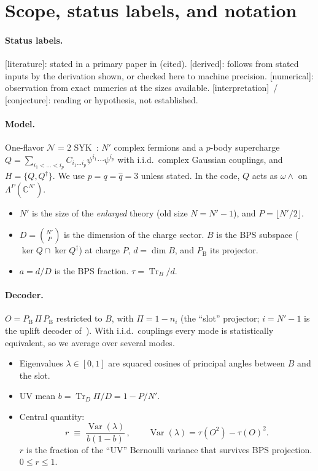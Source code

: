 \documentclass[11pt]{article}
\newcommand{\Tr}{\operatorname{Tr}}
\newcommand{\PB}{P_{\mathrm B}}
\newcommand{\Var}{\operatorname{Var}}
\newcommand{\Np}{N'}
\newcommand{\tagbox}[2]{\textsf{\small\color{#1}[#2]}}
\newcommand{\EST}{\tagbox{cest}{literature}}
\newcommand{\DER}{\tagbox{cder}{derived}}
\newcommand{\NUM}{\tagbox{cnum}{numerical}}
\newcommand{\CONJ}{\tagbox{cconj}{conjecture}}
\newcommand{\INTERP}{\tagbox{cconj}{interpretation}}
\theoremstyle{remark}
\begin{document}
\tableofcontents

\section{Scope, status labels, and notation}

\paragraph{Status labels.}
\EST: stated in a primary paper in  (cited).
\DER: follows from stated inputs by the derivation shown, or checked here to machine precision.
\NUM: observation from exact numerics at the sizes available.
\INTERP\ / \CONJ: reading or hypothesis, not established.

\paragraph{Model.} One-flavor $\mathcal N{=}2$ SYK~\cite{FGMS,CV}: $\Np$ complex fermions and a $p$-body supercharge
$Q=\sum_{i_1<\dots<i_p}C_{i_1\dots i_p}\psi^{i_1}\cdots\psi^{i_p}$ with i.i.d.\ complex Gaussian couplings, and
$H=\{Q,Q^\dagger\}$. We use $p=q=\hat q=3$ unless stated. In the code, $Q$ acts as $\omega\wedge$ on
$\Lambda^P(\mathbb C^{\Np})$.
\begin{itemize}\itemsep1pt
\item $\Np$ is the size of the \emph{enlarged} theory (old size $N=\Np-1$), and $P=\lfloor \Np/2\rfloor$.
\item $D=\binom{\Np}{P}$ is the dimension of the charge sector. $B$ is the BPS subspace ($\ker Q\cap\ker Q^\dagger$) at
  charge $P$, $d=\dim B$, and $\PB$ its projector.
\item $a=d/D$ is the BPS fraction. $\tau=\Tr_B/d$.
\end{itemize}

\paragraph{Decoder.} $O=\PB\,\Pi\,\PB$ restricted to $B$, with $\Pi=1-n_i$ (the ``slot'' projector; $i=\Np-1$ is the
uplift decoder of~\cite{CV}). With i.i.d.\ couplings every mode is statistically equivalent, so we average over
several modes.
\begin{itemize}\itemsep1pt
\item Eigenvalues $\lambda\in[0,1]$ are squared cosines of principal angles between $B$ and the slot.
\item UV mean $b=\Tr_D\Pi/D=1-P/\Np$.
\item Central quantity:
\begin{equation}
r\;\equiv\;\frac{\Var(\lambda)}{b(1-b)}\,,\qquad \Var(\lambda)=\tau(O^2)-\tau(O)^2 .
\label{eq:rdef}
\end{equation}
$r$ is the fraction of the ``UV'' Bernoulli variance that survives BPS projection. $0\le r\le 1$.
\end{itemize}
\end{document}
